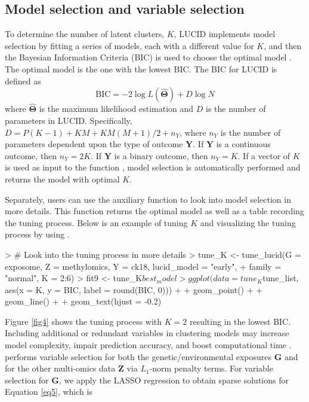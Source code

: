 \subsection{Model selection and variable selection} \label{sec3.3}
To determine the number of latent clusters, $K$, LUCID implements model selection by fitting a series of models, each with a different value for $K$, and then the Bayesian Information Criteria (BIC) is used to choose the optimal model \citep{fan2013tuning}. The optimal model is the one with the lowest BIC. The BIC for LUCID is defined as
\begin{equation}
    \text{BIC} = -2 \log L(\hat{\bm \Theta}) + D \log N
\end{equation}
where $\hat{\bm \Theta}$ is the maximum likelihood estimation and $D$ is the number of parameters in LUCID. Specifically, $D = P(K - 1) + KM + KM(M + 1)/2 + n_Y$, where $n_Y$ is the number of parameters dependent upon the type of outcome $\bm Y$. If $\bm Y$ is a continuous outcome, then $n_Y = 2K$. If $\bm Y$ is a binary outcome, then $n_Y = K$. If a vector of $K$ is used as input to the function , model selection is automatically performed and returns the model with optimal $K$.
Separately, users can use the auxiliary function  to look into model selection in more details. This function returns the optimal model as well as a table recording the tuning process. Below is an example of tuning $K$ and visualizing the tuning process by using .
\begin{example}
> # Look into the tuning process in more details
> tune_K <- tune_lucid(G = exposome, Z = methylomics, Y = ck18, lucid_model = "early", 
+                      family = "normal", K = 2:6)
> fit9 <- tune_K$best_model
> ggplot(data = tune_K$tune_list, aes(x = K, y = BIC, label = round(BIC, 0))) + 
+   geom_point() +
+   geom_line() + 
+   geom_text(hjust = -0.2)
\end{example}
Figure \ref{fig4} shows the tuning process with $K = 2$ resulting in the lowest BIC.
Including additional or redundant variables in clustering models may increase model complexity, impair prediction accuracy, and boost computational time \citep{fop2018variable}.  performs variable selection for both the genetic/environmental exposures $\bm G$ and for the other multi-omics data $\bm Z$ via $L_1$-norm penalty terms. For variable selection for $\bm G$, we apply the LASSO regression to obtain sparse solutions for Equation \ref{eq5}, which is
